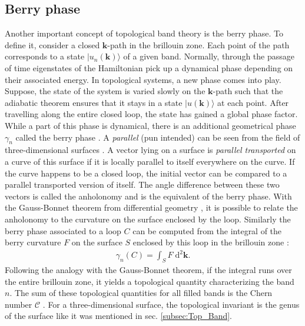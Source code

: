 \subsection{Berry phase}
Another important concept of topological band theory is the berry phase. To define it, consider a closed $\mathbf{k}$-path in the brillouin zone. Each point of the path corresponds to a state $|u_n(\mathbf{k})\rangle$ \cite{bernevig_topological_2013} of a given band. Normally, through the passage of time eigenstates of the Hamiltonian pick up a dynamical phase depending on their associated energy. In topological systems, a new phase comes into play. Suppose, the state of the system is varied slowly on the $\mathbf{k}$-path such that the adiabatic theorem ensures that it stays in a state $|u(\mathbf{k})\rangle$ at each point. After travelling along the entire closed loop, the state has gained a global phase factor. While a part of this phase is dynamical, there is an additional geometrical phase $\gamma_n$ called the berry phase \cite{bernevig_topological_2013}. A \textit{parallel} (pun intended) can be seen from the field of three-dimensional surfaces \cite{chang_x_nodate}. A vector lying on a surface is \textit{parallel transported} on  a curve of this surface if it is locally parallel to itself everywhere on the curve. If the curve happens to be a closed loop, the initial vector can be compared to a parallel transported version of itself. The angle difference between these two vectors is called the anholonomy \cite{chang_x_nodate} and is the equivalent of the berry phase. With the Gauss-Bonnet theorem from differential geometry \cite{chang_x_nodate}, it is possible to relate the anholonomy to the curvature on the surface enclosed by the loop. Similarly the berry phase associated to a loop $C$ can be computed from the integral of the berry curvature $F$ on the surface $S$ enclosed by this loop in the brillouin zone \cite{kane_topological_2013}:
\begin{align}
   \gamma_n(C) =  \int_S F \; \text{d}^2\mathbf{k}. \tag{$\star$} \label{berry}
\end{align}
Following the analogy with the Gauss-Bonnet theorem, if the integral runs over the entire brillouin zone, it yields a topological quantity characterizing the band $n$. The sum of these topological quantities for all filled bands is the Chern number $\mathcal{C}$ \cite{bernevig_topological_2013}. For a three-dimensional surface, the topological invariant is the genus of the surface like it was mentioned in sec. \ref{subsec:Top_Band}.\\

